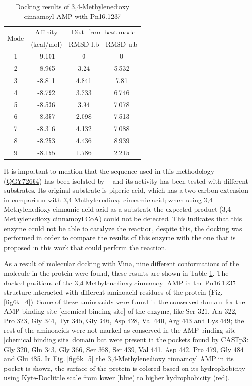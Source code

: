 \documentclass[12pt]{article}
\newcommand{\textcite}[1]{\citeauthor{#1}~\citeyear{#1}}
\begin{document}
	\begin{table}
		\centering
		\caption{\centering Docking results of 3,4-Methylenedioxy cinnamoyl AMP with Pn16.1237}
		\label{table6k}
		\begin{tabular}{cccc}
			\toprule
			\multirow{2}{*}{Mode} & Affinity & \multicolumn{2}{c}{Dist. from best mode}\\
			&  (kcal/mol) & RMSD l.b & RMSD u.b\\
			\midrule
			1 & -9.101   &       0   &       0\\
			2 & -8.965   &    3.24   &   5.532\\
			3 & -8.811   &   4.841   &    7.81\\
			4 & -8.792   &   3.333   &   6.746\\
			5 & -8.536   &    3.94   &   7.078\\
			6 & -8.357   &   2.098   &   7.513\\
			7 & -8.316   &   4.132   &   7.088\\
			8 & -8.253   &   4.436   &   8.939\\
			9 & -8.155   &   1.786   &   2.215\\
			\bottomrule
			
		\end{tabular}
	\end{table}
	
	It is important to mention that the sequence used in this methodology (\href{https://www.ncbi.nlm.nih.gov/protein/QGY72664.1/}{QGY72664}) has been isolated by \textcite{coaligase} and its activity has been tested with different substrates. Its original substrate is piperic acid, which has a two carbon extension in comparison with 3,4-Methylenedioxy cinnamic acid; when using 3,4-Methylenedioxy cinnamic acid acid as a substrate the expected product (3,4-Methylenedioxy cinnamoyl CoA) could not be detected. This indicates that this enzyme could not be able to catalyze the reaction, despite this, the docking was performed in order to compare the results of this enzyme with the one that is proposed in this work that could perform the reaction.
	
	As a result of molecular docking with Vina, nine different conformations of the molecule in the protein were found, these results are shown in Table \ref{table6k}. The docked positions of the 3,4-Methylenedioxy cinnamoyl AMP in the Pn16.1237 structure interacted with different aminoacid residues of the protein (Fig. \ref{fig6k_4}). Some of these aminoacids were found in the conserved domain for the AMP binding site [chemical binding site] of the enzyme, like Ser 321, Ala 322, Pro 323, Gly 344, Tyr 345, Gly 346, Asp 428, Val 440, Arg 443 and Lys 449; the rest of the aminoacids were not marked as conserved in the AMP binding site [chemical binding site] domain but were present in the pockets found by CASTp3: Gly 320, Gln 343, Gly 366, Ser 368, Ser 439, Val 441, Asp 442, Pro 479, Gly 484 and Glu 485. In Fig. \ref{fig6k_5} the 3,4-Methylenedioxy cinnamoyl AMP in its pocket is shown, the surface of the protein is colored based on its hydrophobicity using Kyte-Doolittle scale from lower (blue) to higher hydrophobicity (red).
	
\end{document}
